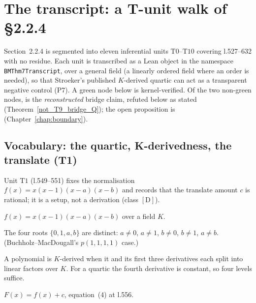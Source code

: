 \chapter{The transcript: a T-unit walk of \S2.2.4}\label{chap:transcript}

Section~2.2.4 is segmented into eleven inferential units $\mathrm{T0}$--$\mathrm{T10}$
covering l.527--632 with no residue.  Each unit is transcribed as a Lean object in the
namespace \texttt{BMThm7Transcript}, over a general field (a linearly ordered field
where an order is needed), so that Stroeker's published $K$-derived quartic can act as
a transparent negative control (P7).  A green node below is kernel-verified.  Of the two
non-green nodes,  is the \emph{reconstructed} bridge
claim, refuted below as stated (Theorem~\ref{not_T9_bridge_Q}); the open proposition is
 (Chapter~\ref{chap:boundary}).

\section{Vocabulary: the quartic, K-derivedness, the translate (T1)}

Unit $\mathrm{T1}$ (l.549--551) fixes the normalisation $f(x)=x(x-1)(x-a)(x-b)$ and
records that the translate amount $c$ is rational; it is a setup, not a derivation
(class $[\mathrm{D}]$).

\begin{definition}\label{bmQuartic}\leanok
$f(x)=x(x-1)(x-a)(x-b)$ over a field $K$.
\end{definition}

\begin{definition}\label{DistinctRoots}\leanok
{}
The four roots $\{0,1,a,b\}$ are distinct: $a\neq 0$, $a\neq 1$, $b\neq 0$, $b\neq 1$,
$a\neq b$.  (Buchholz--MacDougall's $p(1,1,1,1)$ case.)
\end{definition}

\begin{definition}[K-derived]\label{KDerived}\leanok
A polynomial is $K$-derived when it and its first three derivatives each split into
linear factors over $K$.  For a quartic the fourth derivative is constant, so four
levels suffice.
\end{definition}

\begin{definition}\label{translate}\leanok
$F(x)=f(x)+c$, equation~(4) at l.556.
\end{definition}

